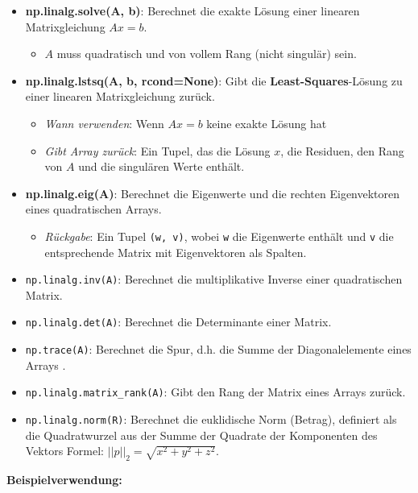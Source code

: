 \begin{itemize}
    \item \textbf{np.linalg.solve(A, b)}: Berechnet die exakte Lösung einer linearen Matrixgleichung $Ax = b$.
    \begin{itemize}
        \item  $A$ muss quadratisch und von vollem Rang (nicht singulär) sein.
    \end{itemize}

    \item \textbf{np.linalg.lstsq(A, b, rcond=None)}: Gibt die \textbf{Least-Squares}-Lösung zu einer linearen Matrixgleichung zurück.
    \begin{itemize}
        \item \textit{Wann verwenden}: Wenn $Ax = b$ keine exakte Lösung hat 
        \item \textit{Gibt Array zurück}: Ein Tupel, das die Lösung $x$, die Residuen, den Rang von $A$ und die singulären Werte enthält.
    \end{itemize}

    \item \textbf{np.linalg.eig(A)}: Berechnet die Eigenwerte und die rechten Eigenvektoren eines quadratischen Arrays.
    \begin{itemize}
        \item \textit{Rückgabe}: Ein Tupel \texttt{(w, v)}, wobei \texttt{w} die 
        Eigenwerte enthält und \texttt{v} die entsprechende Matrix mit Eigenvektoren als Spalten.
    \end{itemize}
    \item \texttt{np.linalg.inv(A)}: Berechnet die multiplikative Inverse einer quadratischen Matrix.
    \item \texttt{np.linalg.det(A)}: Berechnet die Determinante einer Matrix.
    \item \texttt{np.trace(A)}: Berechnet die Spur, d.h. die Summe der Diagonalelemente eines Arrays .
    \item \texttt{np.linalg.matrix\_rank(A)}: Gibt den Rang der Matrix eines Arrays zurück.
    \item \texttt{np.linalg.norm(R)}: Berechnet die euklidische Norm (Betrag), definiert als die Quadratwurzel aus der Summe der Quadrate der Komponenten des Vektors  Formel: $||p||_{2} = \sqrt{x^{2} + y^{2} + z^{2}}$.
\end{itemize}

\textbf{Beispielverwendung:}


